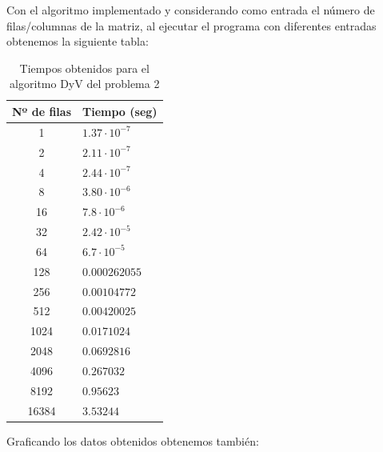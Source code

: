\documentclass{article}
\begin{document}
    Con el algoritmo implementado y considerando como entrada 
    el número de filas/columnas de la matriz, al ejecutar el 
    programa con diferentes entradas obtenemos la siguiente
    tabla:
    \begin{table}[H]
        \centering
    \begin{tabular}{|c|l|}
        \hline
        Nº de filas & Tiempo (seg) \\
        \hline
        1       & $1.37 \cdot 10^{-7}$ \\
        2       & $2.11 \cdot 10^{-7}$ \\
        4       & $2.44 \cdot 10^{-7}$ \\
        8       & $3.80 \cdot 10^{-6}$ \\
        16      & $7.8 \cdot 10^{-6}$ \\
        32      & $2.42 \cdot 10^{-5}$ \\
        64      & $6.7  \cdot 10^{-5}$ \\
        128     & $0.000262055$ \\
        256     & $0.00104772$ \\
        512     & $0.00420025$ \\
        1024    & $0.0171024$ \\
        2048    & $0.0692816$ \\
        4096    & $0.267032$ \\
        8192    & $0.95623$ \\
        16384   & $3.53244$ \\
        \hline
    \end{tabular}
    \caption{\centering Tiempos obtenidos para el algoritmo DyV del problema 2}
    \end{table}

    Graficando los datos obtenidos obtenemos también: 
\end{document}

